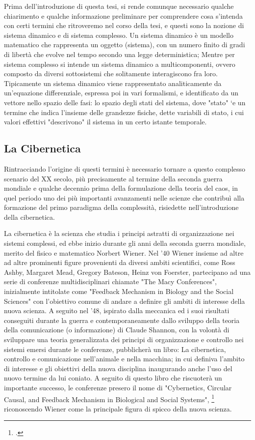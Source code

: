 Prima dell'introduzione di questa tesi, si rende comunque necessario
qualche chiarimento e qualche informazione 
preliminare per comprendere cosa s'intenda con certi termini che ritroveremo
nel corso della tesi, e questi sono la nozione di sistema dinamico e di sistema complesso.
Un sistema dinamico è un modello matematico che rappresenta un oggetto (sistema),
con un numero finito di gradi di libertà che evolve nel tempo secondo una legge
deterministica; Mentre per sistema complesso si intende un sistema dinamico a multicomponenti,
ovvero composto da diversi sottosistemi che solitamente interagiscono fra loro.
Tipicamente un sistema dinamico viene rappresentato analiticamente da un’equazione
differenziale, espressa poi in vari formalismi, e identificato da un vettore nello
spazio delle fasi: lo spazio degli stati del sistema, dove "stato" `e un termine che
indica l’insieme delle grandezze fisiche, dette variabili di stato, i cui valori
effettivi "descrivono" il sistema in un certo istante temporale.

\subsection{La Cibernetica}
\label{sec:La Cibernetica}
Rintracciando l'origine di questi termini è necessario tornare 
a questo complesso scenario del XX secolo,
più precisamente al termine della seconda guerra mondiale e
qualche decennio prima della formulazione della teoria del caos,
in quel periodo uno dei più importanti avanzamenti nelle scienze che contribuì alla
formazione del primo paradigma della complessità,
risiedette nell'introduzione della cibernetica. 

La cibernetica è la scienza che studia i principi astratti di organizzazione
nei sistemi complessi, ed ebbe inizio durante gli anni della seconda guerra
mondiale, merito del fisico e matematico Norbert Wiener.
Nel '40 Wiener insieme ad altre ad altre prominenti figure provenienti
da diversi ambiti scientifici,
come Ross Ashby, Margaret Mead, Gregory Bateson, Heinz von Foerster,
partecipano ad una serie di conferenze
multidisciplinari chiamate "The Macy Conferences", inizialmente intitolate come
"Feedback Mechanism in Biology and the Social Sciences"
con l'obiettivo comune di andare a definire
gli ambiti di interesse della nuova scienza.
A seguito nel '48,
ispirato dalla meccanica ed i suoi risultati conseguiti durante la guerra
e contemporaneamente dallo sviluppo della teoria della comunicazione
(o informazione) di Claude Shannon,
con la volontà di sviluppare una teoria generalizzata dei principi di
organizzazione e controllo nei sistemi emersi durante le conferenze,
pubblicherà un libro:
La cibernetica, controllo e comunicazione nell'animale e nella macchina;
in cui definiva l'ambito di interesse e gli obiettivi della nuova disciplina
inaugurando anche l'uso del nuovo termine da lui coniato.
A seguito di questo libro che riscuoterà
un importante successo, le conferenze presero il nome di
"Cybernetics, Circular Causal, and Feedback Mechanism
in Biological and Social Systems", \footcite{fabbrisgiustinianocyb}
riconoscendo Wiener come la principale figura di spicco della nuova scienza. 

